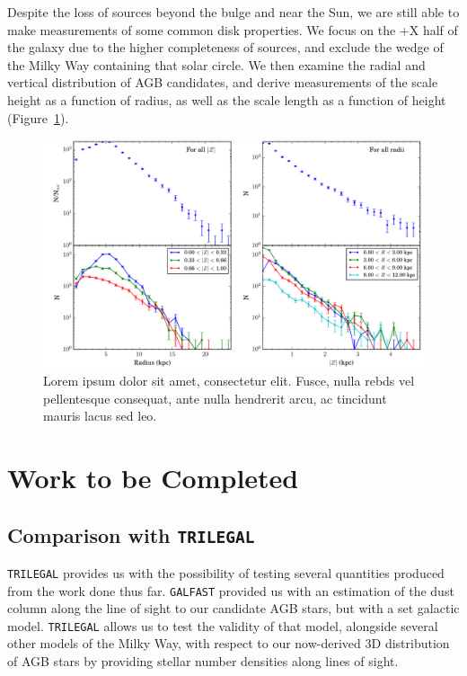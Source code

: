 Despite the loss of sources beyond the bulge and near the Sun, we are still able to make measurements of some common disk properties. We focus on the +X half of the galaxy due to the higher completeness of sources, and exclude the wedge of the Milky Way containing that solar circle. We then examine the radial and vertical distribution of AGB candidates, and derive measurements of the scale height as a function of radius, as well as the scale length as a function of height (Figure~\ref{fig:horvert_profile}).

\begin{figure}[h]
\centering
\includegraphics[width=6.5in]{figs/orich_radial_vertical_profile.pdf}
\caption{Lorem ipsum dolor sit amet, consectetur elit. Fusce, nulla rebds vel pellentesque consequat, ante nulla hendrerit arcu, ac tincidunt mauris lacus sed leo.}
\label{fig:horvert_profile}
\end{figure}

\section{Work to be Completed}
\subsection{Comparison with {\tt TRILEGAL}}
{\tt TRILEGAL} \citep{2005A&A...436..895G, 2007ASPC..378...20G} provides us with the possibility of testing several quantities produced from the work done thus far. {\tt GALFAST} provided us with an estimation of the dust column along the line of sight to our candidate AGB stars, but with a set galactic model. {\tt TRILEGAL}  allows us to test the validity of that model, alongside several other models of the Milky Way, with respect to our now-derived 3D distribution of AGB stars by providing stellar number densities along lines of sight.

